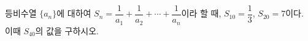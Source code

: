 등비수열 $\{a_n\}$에 대하여 $S_n=\dfrac{1}{a_1}+\dfrac{1}{a_2}+\cdots+\dfrac{1}{a_n}$이라 할 때, $S_{10}=\dfrac{1}{3}$, $S_{20}=7$이다. 이때 $S_{40}$의 값을 구하시오.
